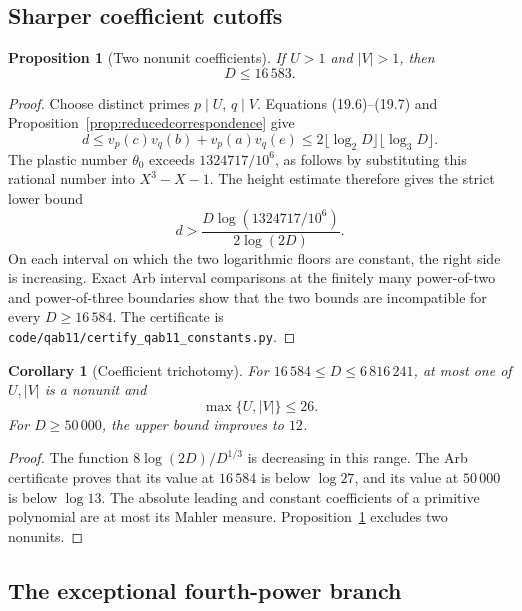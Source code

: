 \documentclass[11pt]{article}
\newtheorem{proposition}[theorem]{Proposition}
\newtheorem{corollary}[theorem]{Corollary}
\theoremstyle{definition}
\begin{document}
\subsection{Sharper coefficient cutoffs}

\begin{proposition}[Two nonunit coefficients]\label{prop:twononunit}
If \(U>1\) and \(|V|>1\), then
\begin{equation}
 \boxed{D\leq16\,583.}
 \tag{19.9}
\end{equation}
\end{proposition}

\begin{proof}
Choose distinct primes \(p\mid U\), \(q\mid V\).  Equations
(19.6)--(19.7) and Proposition~\ref{prop:reducedcorrespondence} give
\[
 d\leq v_p(c)v_q(b)+v_p(a)v_q(e)
 \leq2\lfloor\log_2D\rfloor\lfloor\log_3D\rfloor.
\]
The plastic number \(\theta_0\) exceeds
\(1324717/10^6\), as follows by substituting this rational number into
\(X^3-X-1\).  The height estimate therefore gives the strict lower bound
\[
 d>
 \frac{D\log(1324717/10^6)}{2\log(2D)}.
\]
On each interval on which the two logarithmic floors are constant, the right
side is increasing.  Exact Arb interval comparisons at the finitely many
power-of-two and power-of-three boundaries show that the two bounds are
incompatible for every \(D\geq16\,584\).  The certificate is
\texttt{code/qab11/certify\_qab11\_constants.py}.
\end{proof}

\begin{corollary}[Coefficient trichotomy]\label{cor:coefftrichotomy}
For \(16\,584\leq D\leq6\,816\,241\), at most one of \(U,|V|\) is a
nonunit and
\[
 \max\{U,|V|\}\leq26.
\]
For \(D\geq50\,000\), the upper bound improves to \(12\).
\end{corollary}

\begin{proof}
The function \(8\log(2D)/D^{1/3}\) is decreasing in this range.  The Arb
certificate proves that its value at \(16\,584\) is below \(\log27\), and
its value at \(50\,000\) is below \(\log13\).  The absolute leading and
constant coefficients of a primitive polynomial are at most its Mahler
measure.  Proposition~\ref{prop:twononunit} excludes two nonunits.
\end{proof}

\subsection{The exceptional fourth-power branch}
\end{document}
